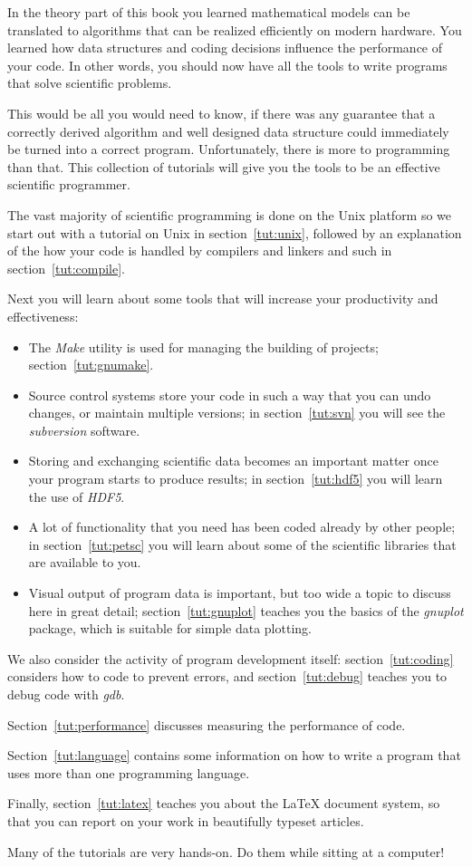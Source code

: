 In the theory part of this book you learned mathematical models can be
translated to algorithms that can be realized efficiently on modern
hardware. You learned how data structures and coding decisions
influence the performance of your code. In other words, you should now
have all the tools to write programs that solve scientific problems.

This would be all you would need to know,
if there was any guarantee that a correctly derived algorithm and
well designed data structure could immediately be turned into a
correct program.
Unfortunately, there is more to programming than that. This collection
of tutorials will give you the tools to be an effective scientific
programmer.

The vast majority of
scientific programming is done on the Unix platform so we start out
with a tutorial on Unix in section~\ref{tut:unix}, followed by an
explanation of the how your code is handled by compilers and linkers
and such in section~\ref{tut:compile}.

Next you will learn about some tools that will increase your
productivity and effectiveness: 
\begin{itemize}
\item The \emph{Make} utility is used for managing the building of
  projects; section~\ref{tut:gnumake}.
\item Source control systems store your code in such a way that you
  can undo changes, or maintain multiple versions; in
  section~\ref{tut:svn} you will see the \emph{subversion} software.
\item Storing and exchanging scientific data becomes an important
  matter once your program starts to produce results; in
  section~\ref{tut:hdf5} you will learn the use of \emph{HDF5}.
\item A lot of functionality that you need has been coded already by
  other people; in section~\ref{tut:petsc} you will learn about some
  of the scientific libraries that are available to you.
\item Visual output of program data is important, but too wide a topic
  to discuss here in great detail; section~\ref{tut:gnuplot} teaches
  you the basics of the \emph{gnuplot} package, which is suitable for
  simple data plotting.
\end{itemize}

We also consider the activity of program development itself:
section~\ref{tut:coding} considers how to code to prevent errors, and
section~\ref{tut:debug} teaches you to debug code with
\emph{gdb}. 
\begin{notready}
Section~\ref{tut:performance} discusses measuring the
performance of code.
\end{notready}
Section~\ref{tut:language} contains some information on
how to write a program that uses more than one programming language.

Finally, section~\ref{tut:latex} teaches you about the \LaTeX{}
document system, so that you can report on your work in beautifully
typeset articles.

Many of the tutorials are very hands-on. Do them while sitting at a
computer!
